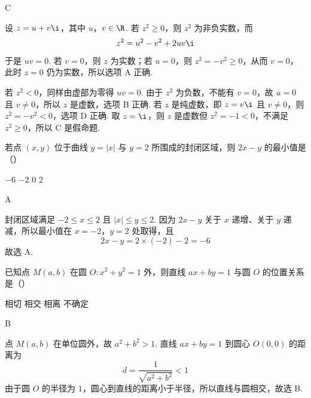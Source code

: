 \begin{answer}
C
\end{answer}

\begin{solution}
设 \(z=u+v\i\)，其中 \(u\)，\(v\in\R\). 若 \(z^2\geqslant0\)，则 \(z^2\) 为非负实数，而
\[
z^2=u^2-v^2+2uv\i
\]
于是 \(uv=0\). 若 \(v=0\)，则 \(z\) 为实数；若 \(u=0\)，则 \(z^2=-v^2\geqslant0\)，从而 \(v=0\)，此时 \(z=0\) 仍为实数，所以选项 A 正确.

若 \(z^2<0\)，同样由虚部为零得 \(uv=0\). 由于 \(z^2\) 为负数，不能有 \(v=0\)，故 \(u=0\) 且 \(v\ne0\)，所以 \(z\) 是虚数，选项 B 正确. 若 \(z\) 是纯虚数，即 \(z=v\i\) 且 \(v\ne0\)，则 \(z^2=-v^2<0\)，选项 D 正确. 取 \(z=\i\)，则 \(z\) 是虚数但 \(z^2=-1<0\)，不满足 \(z^2\geqslant0\)，所以 C 是假命题.
\end{solution}

\begin{problem}
若点 \((x, y)\) 位于曲线 \(y = |x|\) 与 \(y = 2\) 所围成的封闭区域，则 \(2x - y\) 的最小值是（\quad）

\choices
    {\(-6\)}
    {\(-2\)}
    {0}
    {2}
\end{problem}

\begin{answer}
A
\end{answer}

\begin{solution}
封闭区域满足 \(-2\leqslant x\leqslant2\) 且 \(|x|\leqslant y\leqslant2\). 因为 \(2x-y\) 关于 \(x\) 递增、关于 \(y\) 递减，所以最小值在 \(x=-2\)，\(y=2\) 处取得，且
\[
2x-y=2\times(-2)-2=-6
\]
故选 A.
\end{solution}

\begin{problem}
已知点 \(M(a, b)\) 在圆 \(O: x^2 + y^2 = 1\) 外，则直线 \(ax + by = 1\) 与圆 \(O\) 的位置关系是（\quad）

\choices
    {相切}
    {相交}
    {相离}
    {不确定}
\end{problem}

\begin{answer}
B
\end{answer}

\begin{solution}
点 \(M(a,b)\) 在单位圆外，故 \(a^2+b^2>1\). 直线 \(ax+by=1\) 到圆心 \(O(0,0)\) 的距离为
\[
d=\frac{1}{\sqrt{a^2+b^2}}<1
\]
由于圆 \(O\) 的半径为 \(1\)，圆心到直线的距离小于半径，所以直线与圆相交，故选 B.
\end{solution}


